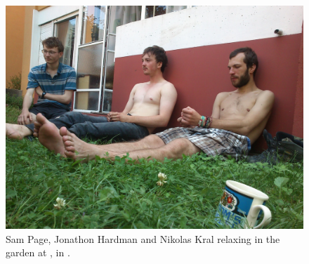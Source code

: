 

\begin{figure}
\checkoddpage \ifoddpage \forcerectofloat \else \forceversofloat \fi
   \centering
\includegraphics[width = \textwidth]{2012/piss_bandits/JarvistMooreFrost-DSC_0288--orig.jpg}
\caption{Sam Page, Jonathon Hardman and Nikolas Kral relaxing in the garden at , in . } \label{flat garden}
\end{figure}